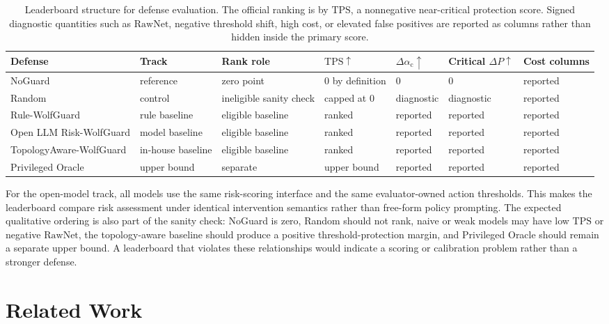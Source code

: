 \documentclass[letterpaper]{article} %
\newcommand{\shift}{\Delta\alpha_{\mathrm{c}}}
\newcommand{\tps}{\mathrm{TPS}}
\newcommand{\rawnet}{\mathrm{RawNet}}
\begin{document}
\begin{table}[t]
\centering
\small
\begin{tabular}{lllllll}
\toprule
Defense & Track & Rank role & \(\tps\uparrow\) & \(\shift\uparrow\) & Critical \(\Delta P\uparrow\) & Cost columns \\
\midrule
NoGuard & reference & zero point & 0 by definition & 0 & 0 & reported \\
Random & control & ineligible sanity check & capped at 0 & diagnostic & diagnostic & reported \\
Rule-WolfGuard & rule baseline & eligible baseline & ranked & reported & reported & reported \\
Open LLM Risk-WolfGuard & model baseline & eligible baseline & ranked & reported & reported & reported \\
TopologyAware-WolfGuard & in-house baseline & eligible baseline & ranked & reported & reported & reported \\
Privileged Oracle & upper bound & separate & upper bound & reported & reported & reported \\
\bottomrule
\end{tabular}
\caption{Leaderboard structure for defense evaluation. The official ranking is
by \(\tps\), a nonnegative near-critical protection score. Signed diagnostic
quantities such as \(\rawnet\), negative threshold shift, high cost, or elevated
false positives are reported as columns rather than hidden inside the primary
score.}
\label{tab:tps-leaderboard}
\end{table}

For the open-model track, all models use the same risk-scoring interface and
the same evaluator-owned action thresholds. This makes the leaderboard compare
risk assessment under identical intervention semantics rather than free-form
policy prompting. The expected qualitative ordering is also part of the sanity
check: NoGuard is zero, Random should not rank, naive or weak models may have
low \(\tps\) or negative \(\rawnet\), the topology-aware baseline should
produce a positive threshold-protection margin, and Privileged Oracle should
remain a separate upper bound. A leaderboard that violates these relationships
would indicate a scoring or calibration problem rather than a stronger defense.

\section{Related Work}
\end{document}
